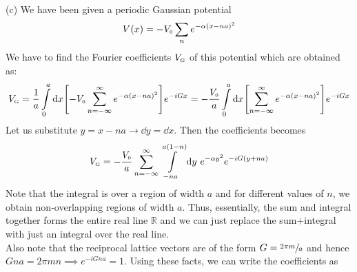 \documentclass[usenames, svgnames, dvipsnames]{scrartcl}
\newcommand{\tund}[1]{_{\text{\tiny #1}}}
\begin{document}
\noindent
(c) We have been given a periodic Gaussian potential 
$$V(x) = -V\tund{0}\sum\limits_n e^{-\alpha(x-na)^2}$$
We have to find the Fourier coefficients $V\tund{G}$ of this potential which are obtained as: 
$$V\tund{G}= \frac{1}{a}\int\limits_0^a \dd x \qty[-V\tund{0}\sum\limits_{n=-\infty}^{\infty}  e^{-\alpha(x-na)^2}] e^{-iGx} = -\frac{V\tund{0}}{a}\int\limits_0^a \dd x \qty[\sum\limits_{n=-\infty}^{\infty}  e^{-\alpha(x-na)^2}] e^{-iGx}$$
Let us substitute $y=x-na\longrightarrow \dd y = \dd x$. Then the coefficients becomes 
$$V\tund{G}=-\frac{V\tund{0}}{a}\sum\limits_{n=-\infty}^{\infty} \int\limits_{-na}^{a(1-n)} \dd y \ e^{-\alpha y^2} e^{-iG(y+na)}$$
Note that the integral is over a region of width $a$ and for different values of $n$, we obtain non-overlapping regions of width $a$. Thus, essentially, the sum and integral together forms the entire real line $\mathbb{R}$ and we can just replace the sum$+$integral with just an integral over the real line.\\[0.2cm]
Also note that the reciprocal lattice vectors are of the form $G=\sfrac{2\pi m}{a}$ and hence $Gna = 2\pi m n \implies e^{-iGna}=1$. Using these facts, we can write the coefficients as 
\end{document}
